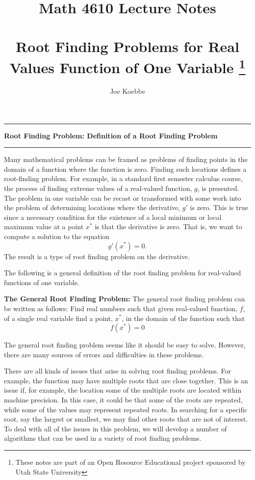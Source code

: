 \documentclass[10pt,fleqn]{article}
\title{Math 4610 Lecture Notes \\
            \ \\
      Root Finding Problems for Real Values Function of One Variable
  \footnote{These notes are part of an Open Resource Educational project
            sponsored by Utah State University}}
\author{Joe Koebbe}
\begin{document}
\maketitle
\newpage
\vskip0.1in\hrule\vskip0.1in
\noindent
{\bf Root Finding Problem: Definition of a Root Finding Problem} 
\vskip0.1in\hrule\vskip0.1in
\noindent
Many mathematical problems can be framed as problems of finding points in the
domain of a function where the function is zero. Finding such locations defines
a root-finding problem. For example, in a standard first semester calculus
course, the process of finding extreme values of a real-valued function, $g$, is
presented. The problem in one variable can be recast or transformed with some
work into the problem of determining locations where the derivative, $g'$ is
zero. This is true since a necessary condition for the existence of a local
minimum or local maximum value at a point $x^*$ is that the derivative is zero.
That is, we want to compute a solution to the equation
$$
  g'(x^*)=0.
$$
The result is a type of root finding problem on the derivative.

The following is a general definition of the root finding problem for
real-valued functions of one variable.
\begin{definition}
  {\bf The General Root Finding Problem:} The general root finding problem can
  be written as follows: Find real numbers such that given real-valued function, $f$, of a single real
  variable find a point, $x^*$, in the domain of the function such that
  $$
    f(x^*) = 0
  $$
\end{definition}
The general root finding problem seems like it should be easy to solve. However,
there are many sources of errors and difficulties in these problems.

There are all kinds of issues that arise in solving root finding problems. For
example, the function may have multiple roots that are close together. This is
an issue if, for example, the location some of the multiple roots are located
within machine precision. In this case, it could be that some of the roots are
repeated, while some of the values may represent repeated roots. In searching
for a specific root, say the largest or smallest, we may find other roots that
are not of interest. To deal with all of the issues in this problem, we will
develop a number of algorithms that can be used in a variety of root finding
problems.
\end{document}
